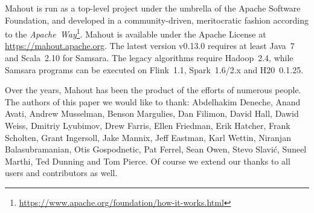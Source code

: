 \documentclass[twoside,11pt]{article}
\begin{document}
Mahout is run as a top-level project under the umbrella of the Apache Software Foundation, and developed in a community-driven, meritocratic fashion according to the \textit{Apache~Way}\footnote{\url{https://www.apache.org/foundation/how-it-works.html}}. Mahout is available under the Apache License at \url{https://mahout.apache.org}. The latest version v0.13.0 requires at least Java~7 and Scala~2.10 for Samsara. The legacy algorithms require Hadoop~2.4, while Samsara programs can be executed on Flink~1.1, Spark~1.6/2.x and H20~0.1.25.

\newpage
\acks{}
Over the years, Mahout has been the product of the efforts of numerous people. The authors of this paper we would like to thank: Abdelhakim Deneche, Anand Avati, Andrew Musselman, Benson Margulies, Dan Filimon, David Hall, Dawid Weiss, Dmitriy Lyubimov, Drew Farris, Ellen Friedman, Erik Hatcher, Frank Scholten, Grant Ingersoll, Jake Mannix, Jeff Eastman, Karl Wettin, Niranjan Balasubramanian, Otis Gospodnetic, Pat Ferrel, Sean Owen, Stevo Slavić, Suneel Marthi, Ted Dunning and Tom Pierce. Of course we extend our thanks to all users and contributors as well.


\end{document}
